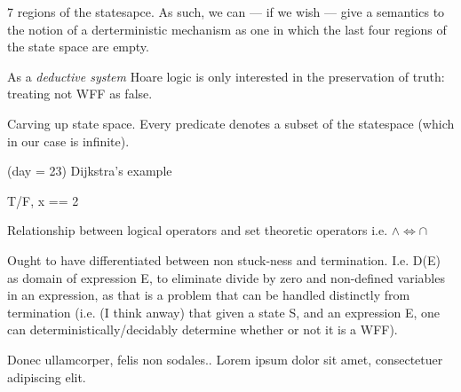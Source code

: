 \documentclass[oneside,12pt]{article}
\begin{document}
7 regions of the statesapce. As such, we can --- if we wish --- give a semantics to the notion of a derterministic mechanism as one in which the last four regions of the state space are empty.






As a \emph{deductive system} Hoare logic is only interested in the preservation of truth: treating not WFF as false.

Carving up state space.
Every predicate denotes a subset of the statespace
(which in our case is infinite).

(day = 23) Dijkstra's example

T/F, x == 2

Relationship between logical operators and set theoretic operators
i.e. $\wedge \Leftrightarrow \cap$

{\advance\leftskip\mathindent



}

Ought to have differentiated between non stuck-ness and termination. I.e. D(E) as domain of expression E, to eliminate divide by zero and non-defined variables in an expression, as that is a problem that can be handled distinctly from termination
(i.e. (I think anway) that given a state S, and an expression E, one can deterministically/decidably determine whether or not it is a WFF).

Donec ullamcorper, felis non sodales.. Lorem  ipsum  dolor  sit  amet,  consectetuer  adipiscing  
elit.





\nocite{*}




 
\end{document}
